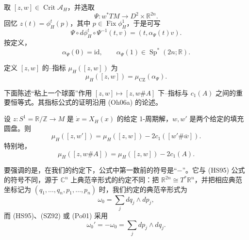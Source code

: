 取 $[z,w]\in\operatorname{Crit}\mathcal A_H$，并选取\termTrivialization{}
\[
 \Psi:w^*TM\longrightarrow D^2\times\mathbb R^{2n}.
\]
回忆 $z(t)=\phi_H^t(p)$，其中 $p\in\operatorname{Fix}\phi_H^1$，于是可写
\[
 \Psi\circ d\phi_H^t\circ\Psi^{-1}(t,v)=(t,\alpha_\Psi(t)v).
\]
按定义，
\[
 \alpha_\Psi(0)=\mathrm{id},\qquad
 \alpha_\Psi(1)\in\operatorname{Sp}^*(2n;\mathbb R).
\]

\begin{definition}
\label{def:18-conley-zehnder-capped-orbit}
定义 $[z,w]$ 的\personConley{}--\personZehnder{}指标 $\mu_H([z,w])$ 为
\[
 \mu_H([z,w])=\mu_{\mathrm{CZ}}(\alpha_\Psi).
\]
\end{definition}

下面陈述“粘上一个球面”作用
$[z,w]\mapsto[z,w\#A]$ 下\personConley{}--\personZehnder{}指标与\termFirstChernNumber{}
$c_1(A)$ 之间的重要恒等式。其指标公式的证明沿用 (Oh06a) 的论述。

\begin{theorem}
\label{thm:18-conley-zehnder-capping-change}
设 $z:S^1=\mathbb R/\mathbb Z\to M$ 是
$\dot x=X_H(x)$ 的给定 1-周期解，$w,w'$ 是两个给定的填充圆盘。则
\begin{equation}
 \mu_H([z,w'])=\mu_H([z,w])-2c_1([w'\#\overline w]).
 \label{eq:18-index-two-cappings}
\end{equation}
特别地，
\begin{equation}
 \mu_H([z,w\#A])=\mu_H([z,w])-2c_1(A).
 \label{eq:18-index-sphere-gluing}
\end{equation}
\end{theorem}

\begin{remark}
\label{rem:18-conley-zehnder-sign-convention}
要强调的是，在我们的约定下，公式中第一\personChern{}数前的符号是“$-$”。它与 (HS95)
公式的符号不同，源于 $\mathbb C^n$ 上典范辛形式的约定不同：把
$\mathbb R^{2n}\cong T^*\mathbb R^n$，并把相应典范坐标记为
$(q_1,\ldots,q_n,p_1,\ldots,p_n)$ 时，我们约定的典范辛形式为
\begin{equation}
 \omega_0=\sum_jdq_j\wedge dp_j,
 \label{eq:18-canonical-symplectic-sign}
\end{equation}
而 (HS95)、(SZ92) 或 (Po01) 采用
\[
 \omega_0'=-\omega_0=\sum_jdp_j\wedge dq_j.
\]
\end{remark}

